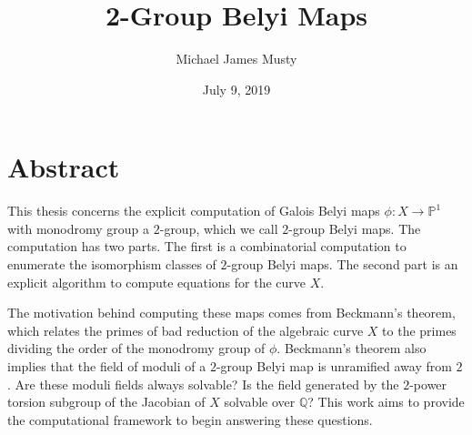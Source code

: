 \documentclass{dcthesis}
\title{2-Group Belyi Maps}
\author{Michael James Musty}
\date{July 9, 2019}
\newcommand{\PP}{\mathbb P}
\newcommand{\QQ}{\mathbb Q}
\newcommand{\mm}[1]{{\color{blue} \sf MM: [#1]}}
\numberwithin{equation}{section}
\theoremstyle{definition}
\theoremstyle{remark}
\begin{document}
\frontmatter

\maketitle

\chapter*{Abstract}
This thesis concerns the explicit computation
of Galois Belyi maps
$\phi\colon X\to\PP^1$
with monodromy group
a $2$-group,
which we call $2$-group Belyi maps.
The computation has two parts.
The first is a combinatorial computation
to enumerate the isomorphism classes
of $2$-group Belyi maps.
The second part is an explicit algorithm
to compute equations for the curve
$X$.
\par
The motivation behind computing these maps comes from Beckmann's theorem,
which relates the primes of bad reduction of the algebraic curve
$X$ to the primes dividing the order of the monodromy group of $\phi$.
Beckmann's theorem also implies that the field of
moduli of a $2$-group Belyi map is unramified away from $2$.
Are these moduli fields always solvable?
Is the field generated by the $2$-power torsion
subgroup of the Jacobian of $X$ solvable over $\QQ$?
This work aims to provide the computational framework
to begin answering these questions.

\end{document}
